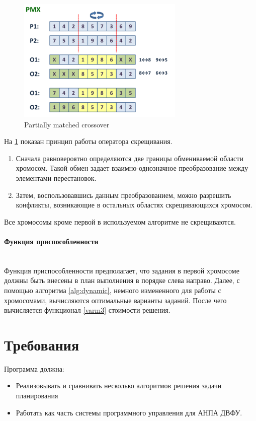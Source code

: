 \documentclass[a4paper,14pt,russian]{article}
\begin{document}
\begin{figure}[here]
\includegraphics{images/300px-Pmx.png}
\caption{Partially matched crossover}
\label{fig:pmx}
\end{figure}

На \cref{fig:pmx} показан принцип работы оператора скрещивания.
\begin{enumerate}
\item Сначала равновероятно определяются две границы обмениваемой области хромосом. Такой обмен задает взаимно-однозначное преобразование между элементами перестановок.
\item Затем, воспользовавшись данным преобразованием, можно разрешить конфликты, возникающие в остальных областях скрещивающихся хромосом.
\end{enumerate}
Все хромосомы кроме первой в используемом алгоритме не скрещиваются.

\paragraph{Функция приспособленности} ~\\
Функция приспособленности предполагает, что задания в первой хромосоме должны быть внесены в план выполнения в порядке слева направо.
Далее, с помощью алгоритма \eqref{alg:dynamic}, немного измененного для работы с хромосомами, вычисляются оптимальные варианты заданий.
После чего вычисляется функционал \eqref{varm3} стоимости решения.


\section{Требования}



Программа должна:
\begin{itemize}
\item Реализовывать и сравнивать несколько алгоритмов решения задачи планирования
\item Работать как часть системы программного управления для АНПА ДВФУ.
\end{itemize}
\end{document}

